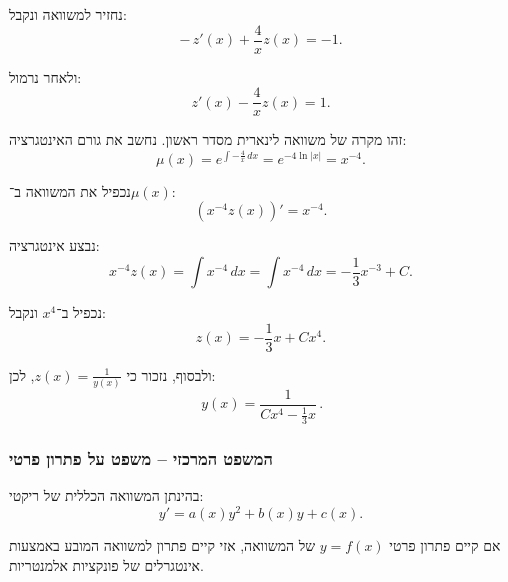 \documentclass{article}
\numberwithin{equation}{section}
\begin{document}
נחזיר למשוואה ונקבל:
\[
-\,z'(x) + \frac{4}{x}z(x) = -1.
\]

ולאחר נרמול:
\[
z'(x) - \frac{4}{x}z(x) = 1.
\]

זהו מקרה של משוואה לינארית מסדר ראשון.  
נחשב את גורם האינטגרציה:
\[
\mu(x) = e^{\int -\tfrac{4}{x}\,dx} = e^{-4\ln|x|} = x^{-4}.
\]

נכפיל את המשוואה ב־$\mu(x)$:
\[
(x^{-4}z(x))' = x^{-4}.
\]

נבצע אינטגרציה:
\[
x^{-4}z(x) = \int x^{-4}\,dx = \int x^{-4}\,dx = -\frac{1}{3}x^{-3} + C.
\]

נכפיל ב־$x^4$ ונקבל:
\[
z(x) = -\frac{1}{3}x + Cx^4.
\]

ולבסוף, נזכור כי $z(x)=\tfrac{1}{y(x)}$, לכן:
\[
\boxed{\,y(x) = \frac{1}{Cx^4 - \tfrac{1}{3}x}\,}.
\]

\subsubsection{המשפט המרכזי – משפט על פתרון פרטי}

בהינתן המשוואה הכללית של ריקטי:  
\[
y' = a(x)y^2 + b(x)y + c(x).
\]

אם קיים פתרון פרטי $y=f(x)$ של המשוואה, אזי קיים פתרון למשוואה המובע באמצעות אינטגרלים של פונקציות אלמנטריות.  
\end{document}
